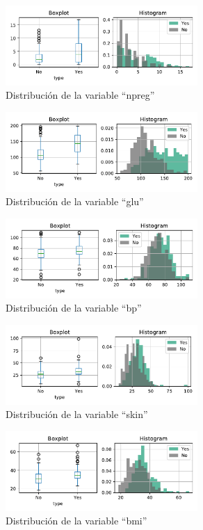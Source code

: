 \documentclass[11pt]{article}
\begin{document}
\begin{figure}[H]
    \centering
    \includegraphics[width = 0.65\textwidth]{1-npreg-dist.pdf}
    \caption{Distribución de la variable ``npreg''}
    \label{1-npreg-dist}
\end{figure}
\begin{figure}[H]
    \centering
    \includegraphics[width = 0.65\textwidth]{1-glu-dist.pdf}
    \caption{Distribución de la variable ``glu''}
    \label{1-glu-dist}
\end{figure}
\begin{figure}[H]
    \centering
    \includegraphics[width = 0.65\textwidth]{1-bp-dist.pdf}
    \caption{Distribución de la variable ``bp''}
    \label{1-bp-dist}
\end{figure}
\begin{figure}[H]
    \centering
    \includegraphics[width = 0.65\textwidth]{1-skin-dist.pdf}
    \caption{Distribución de la variable ``skin''}
    \label{1-skin-dist}
\end{figure}
\begin{figure}[H]
    \centering
    \includegraphics[width = 0.65\textwidth]{1-bmi-dist.pdf}
    \caption{Distribución de la variable ``bmi''}
    \label{1-bmi-dist}
\end{figure}
\end{document}
